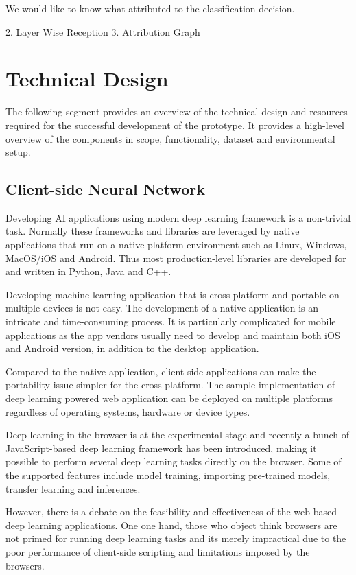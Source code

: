 We would like to know what attributed to the classification decision.

2. Layer Wise Reception
3. Attribution Graph

\section{Technical Design}
The following segment provides an overview of the technical design and resources required for the successful development of the prototype. It provides a high-level overview of the components in scope, functionality, dataset and environmental setup.

\subsection{Client-side Neural Network}
Developing AI applications using modern deep learning framework is a non-trivial task. Normally these frameworks and libraries are leveraged by native applications that run on a native platform environment such as Linux, Windows, MacOS/iOS and Android. Thus most production-level libraries are developed for and written in Python, Java and C++. 

Developing machine learning application that is cross-platform and portable on multiple devices is not easy. The development of a native application is an intricate and time-consuming process. It is particularly complicated for mobile applications as the app vendors usually need to develop and maintain both iOS and Android version, in addition to the desktop application.

Compared to the native application, client-side applications can make the portability issue simpler for the cross-platform. The sample implementation of deep learning powered web application can be deployed on multiple platforms regardless of operating systems, hardware or device types.

Deep learning in the browser is at the experimental stage and recently a bunch of JavaScript-based deep learning framework has been introduced, making it possible to perform several deep learning tasks directly on the browser. Some of the supported features include model training, importing pre-trained models, transfer learning and inferences.

However, there is a debate on the feasibility and effectiveness of the web-based deep learning applications. One one hand, those who object think browsers are not primed for running deep learning tasks and its merely impractical due to the poor performance of client-side scripting and limitations imposed by the browsers. 


